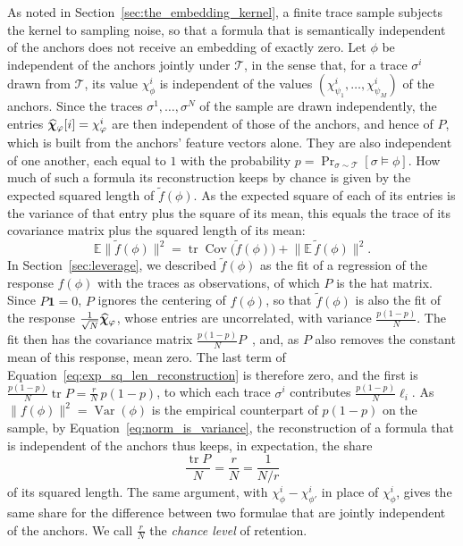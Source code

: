 \documentclass[titlepage,a4paper,11pt]{report}
\begin{document}
    As noted in Section~\ref{sec:the_embedding_kernel}, a finite trace sample subjects the kernel to sampling noise, so that a formula that is semantically independent of the anchors does not receive an embedding of exactly zero. Let $\phi$ be independent of the anchors jointly under $\mathcal T$, in the sense that, for a trace $\sigma^i$ drawn from $\mathcal T$, its value $\chi^i_\phi$ is independent of the values $(\chi^i_{\psi_1},\dots,\chi^i_{\psi_M})$ of the anchors. Since the traces $\sigma^1,\dots,\sigma^N$ of the sample are drawn independently, the entries $\bm{\widehat\chi}_\varphi[i]=\chi^{i}_\varphi$ are then independent of those of the anchors, and hence of $P$, which is built from the anchors' feature vectors alone. They are also independent of one another, each equal to $1$ with the probability $p=\Pr_{\sigma\sim\mathcal T}[\sigma\vDash\phi]$.  How much of such a formula its reconstruction keeps by chance is given by the expected squared length of $\tilde f(\phi)$. As the expected square of each of its entries is the variance of that entry plus the square of its mean, this equals the trace of its covariance matrix plus the squared length of its mean:
    \begin{equation}\label{eq:exp_sq_len_reconstruction}
        \mathbb{E}\lVert\tilde f(\phi)\rVert^2=\operatorname{tr}\operatorname{Cov}\bigl(\tilde f(\phi)\bigr)+\bigl\lVert\mathbb{E}\,\tilde f(\phi)\bigr\rVert^2 .
    \end{equation}
    In Section~\ref{sec:leverage}, we described $\tilde f(\phi)$ as the fit of a regression of the response $f(\phi)$ with the traces as observations, of which $P$ is the hat matrix. Since $P\mathbf 1=0$, $P$ ignores the centering of $f(\phi)$, so that $\tilde f(\phi)$ is also the fit of the response $\frac{1}{\sqrt N}\bm{\widehat\chi}_\varphi$, whose entries are uncorrelated, with variance $\frac{p(1-p)}{N}$. The fit then has the covariance matrix $\frac{p(1-p)}{N}P$~\citep{hoaglin_hat_1978}, and, as $P$ also removes the constant mean of this response, mean zero. The last term of Equation~\eqref{eq:exp_sq_len_reconstruction} is therefore zero, and the first is $\frac{p(1-p)}{N}\operatorname{tr}P=\frac rN\,p(1-p)$, to which each trace $\sigma^i$ contributes $\frac{p(1-p)}{N}\ell_i$. As $\lVert f(\phi)\rVert^2=\operatorname{Var}(\phi)$ is the empirical counterpart of $p(1-p)$ on the sample, by Equation~\eqref{eq:norm_is_variance}, the reconstruction of a formula that is independent of the anchors thus keeps, in expectation, the share
    \begin{equation}\label{eq:chance_level}
        \frac{\operatorname{tr}P}{N}=\frac rN=\frac{1}{N/r}
    \end{equation}
    of its squared length. The same argument, with $\chi^i_\phi-\chi^i_{\phi'}$ in place of $\chi^i_\phi$, gives the same share for the difference between two formulae that are jointly independent of the anchors. We call $\frac rN$ the \textit{chance level} of retention.
\end{document}
